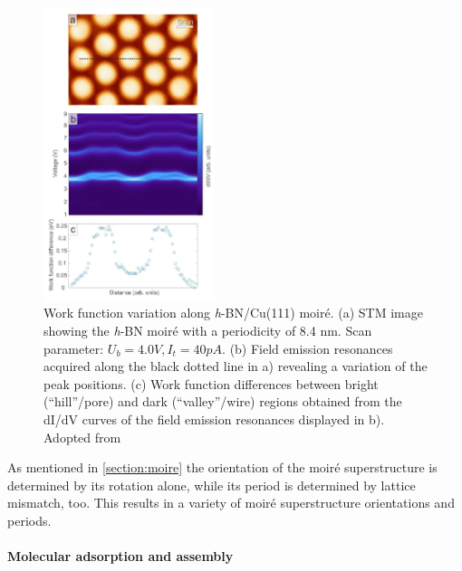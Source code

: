 \begin{figure}\centering
	\includegraphics[width=5cm]{./images/h-BN-Cu(111)-wf-change}
	\caption{Work function variation along \textit{h}-BN/Cu(111) moir\'e. (a) STM image showing the \textit{h}-BN moir\'e with a periodicity of 8.4 nm. Scan parameter: $U_b= 4.0 V, I_t= 40 pA$. (b)	Field emission resonances acquired along the black dotted line in a) revealing a variation of the peak positions. (c) Work  function  differences  between bright  (“hill”/pore)  and  dark  (“valley”/wire)  regions obtained  from  the  dI/dV curves  of  the  field emission  resonances  displayed  in  b). Adopted from \cite{schwarz_corrugation_2017}}
	\label{fig:h-bn-cu-wf}
\end{figure}


As mentioned in \autoref{section:moire} the orientation of the moir\'e superstructure is determined by its rotation alone, while its period is determined by lattice mismatch, too. This results in a variety of moir\'e superstructure orientations and periods.


	\paragraph{Molecular adsorption and assembly}
	\FloatBarrier

